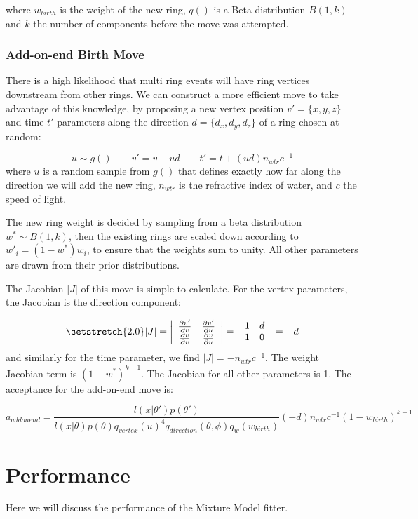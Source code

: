 \documentclass[11pt]{article} %
\begin{document}
where $w_{birth}$ is the weight of the new ring, $q()$ is a Beta distribution $B(1,k)$ and $k$ the number of components before the move was attempted.

\subsubsection{Add-on-end Birth Move}\label{addonend}
There is a high likelihood that multi ring events will have ring vertices downstream from other rings. We can construct a more efficient move to take advantage of this knowledge, by proposing a new vertex position $v'=\{x,y,z\}$ and time $t'$ parameters along the direction $d=\{d_{x},d_{y},d_{z}\}$ of a ring chosen at random:

\begin{equation}
u\sim g() \qquad v' = v + ud\qquad t' = t + (ud)n_{wtr}c^{-1}
\end{equation}
where $u$ is a random sample from $g()$ that defines exactly how far along the direction we will add the new ring, $n_{wtr}$ is the refractive index of water, and $c$ the speed of light.

The new ring weight is decided by sampling from a beta distribution $w^{*}\sim B(1,k)$, then the existing rings are scaled down according to $w'_{i}=(1-w^{*})w_{i}$, to ensure that the weights sum to unity.
All other parameters are drawn from their prior distributions.

The Jacobian $|J|$ of this move is simple to calculate. For the vertex parameters, the Jacobian is the direction component:

\begin{equation}
{\setstretch{2.0}
 |J| = \left| \begin{array}{ccc}
\frac{\partial v'}{\partial v} & \frac{\partial v'}{\partial u}  \\
\frac{\partial v}{\partial v} & \frac{\partial v}{\partial u}  \end{array} \right| = 
\left| \begin{array}{ccc}
1 & d \\
1 & 0 
\end{array} \right| = -d
}
\end{equation}
and similarly for the time parameter, we find $|J| = -n_{wtr}c^{-1}$. The weight Jacobian term is $(1-w^{*})^{k-1}$. The Jacobian for all other parameters is 1. The acceptance for the add-on-end move is:

\begin{equation}\label{eq:addonend}
a_{addonend} = \frac{l(x|\theta')p(\theta')} {l(x|\theta)p(\theta)q_{vertex}(u)^{4}q_{direction}(\theta,\phi)q_{w}(w_{birth})}(-d)n_{wtr}c^{-1}(1-w_{birth})^{k-1}
\end{equation}

\section{Performance}
Here we will discuss the performance of the Mixture Model fitter.

{}

\end{document}
